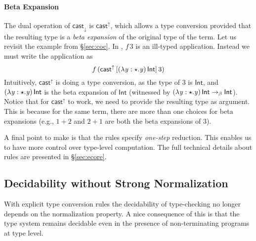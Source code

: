 \paragraph{Beta Expansion} The dual operation of $ \mathsf{cast}_{\downarrow} $ is
$ \mathsf{cast}^{\uparrow} $, which allows a type conversion provided that the
resulting type is a \emph{beta expansion} of the original type of the
term.  Let us revisit the example from \S\ref{sec:coc}. In \name,
$f\,3$ is an ill-typed application. Instead we must write the
application as
\[ f\,(\mathsf{cast}^{\uparrow} \, [  (  \lambda  \mathit{y}  :  \star  .  \mathit{y}  ) \, \mathsf{Int}  ] \,  3) \]
  Intuitively,
$ \mathsf{cast}^{\uparrow} $ is doing a type conversion, as the type of $ 3 $ is
$  \mathsf{Int}  $, and $ (  \lambda  \mathit{y}  :  \star  .  \mathit{y}  ) \, \mathsf{Int} $ is the beta expansion of
$ \mathsf{Int} $ (witnessed by
$(  \lambda  \mathit{y}  :  \star  .  \mathit{y}  ) \, \mathsf{Int} \rightarrow_{\beta}  \mathsf{Int} $).   Notice that for
$ \mathsf{cast}^{\uparrow} $ to work, we need to provide the resulting type as
argument. This is because for the same term, there are more than one
choices for beta expansions (e.g., $1 + 2$ and $2 + 1$ are both the
beta expansions of $3$).  

A final point to make is that the \cast rules specify \emph{one-step}
reduction. This enables us to have more control over type-level
computation. The full technical details about \cast rules are presented
in \S\ref{sec:ecore}.

\subsection{Decidability without Strong Normalization}

With explicit type conversion rules the decidability of type-checking 
no longer depends on the normalization property. 
A nice consequence of this is that the type system remains decidable
even in the presence of non-terminating programs at type level.


